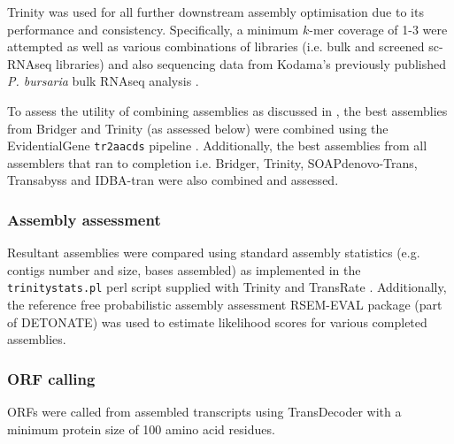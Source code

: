 Trinity was used for all further downstream assembly optimisation due to its performance
and consistency.
Specifically, a minimum \(k\)-mer coverage of 1-3 were attempted as well as various
combinations of libraries (i.e. bulk and screened sc-RNAseq libraries) and also
sequencing data from Kodama's previously published \textit{P. bursaria} bulk
RNAseq analysis \citep{Kodama2014c}.


To assess the utility of combining assemblies as discussed in \citep{Nakasugi2014}, 
the best assemblies from Bridger and Trinity
(as assessed below) were combined using the EvidentialGene \texttt{tr2aacds} pipeline \citep{Gilbert2013}.
Additionally, the best assemblies from all assemblers that ran to completion i.e.
Bridger, Trinity, SOAPdenovo-Trans, Transabyss and IDBA-tran were also combined and 
assessed. 

\subsubsection{Assembly assessment}
\label{sec:assembly_assessment}

Resultant assemblies were compared using standard assembly statistics 
(e.g. contigs number and size, bases assembled) as implemented in the \texttt{trinitystats.pl} perl script supplied with 
Trinity \citep{Haas2013} and TransRate \citep{Smith-unna2015}. 
Additionally, the reference free probabilistic assembly assessment RSEM-EVAL package (part of DETONATE) \citep{Li2014} was used to
estimate likelihood scores for various completed assemblies.

\subsubsection{ORF calling}

ORFs were called from assembled transcripts using TransDecoder \citep{Haas2013} with 
a minimum protein size of 100 amino acid residues.

